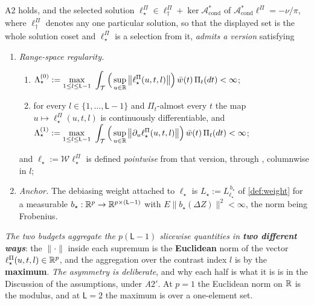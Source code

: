 \begin{assumption}\label{ass:sourcecondp}
A2 holds, and the selected solution
$\ell^\Pi_\star\in\ell^\Pi_\dagger+\ker\mathcal A^\ast_{\mathrm{cond}}$ of
$\mathcal A^\ast_{\mathrm{cond}}\ell^\Pi=-\nu/\pi$, where $\ell^\Pi_\dagger$ denotes any one
particular solution, so that the displayed set is the whole solution coset and $\ell^\Pi_\star$ is a
selection from it, \emph{admits a version} satisfying
\begin{enumerate}
\item[(i)] \emph{Range-space regularity.}
\begin{enumerate}
\item[(i.a)] $\Lambda^{(0)}_\star:=\displaystyle\max_{1\le l\le\mathsf L-1}\ \int_{\mathcal T}\Big(\sup_{u\in\mathbb{R}}\big\|\ell^\Pi_\star(u,t,l)\big\|\Big)\,\bar w(t)\,\Pi_t(dt)<\infty$;
\item[(i.b)] for every $l\in\{1,\dots,\mathsf L-1\}$ and $\Pi_t$-almost every $t$ the map
$u\mapsto\ell^\Pi_\star(u,t,l)$ is continuously
differentiable, and
$\Lambda^{(1)}_\star:=\displaystyle\max_{1\le l\le\mathsf L-1}\ \int_{\mathcal T}\Big(\sup_{u\in\mathbb{R}}\big\|\partial_u\ell^\Pi_\star(u,t,l)\big\|\Big)\,\bar w(t)\,\Pi_t(dt)<\infty$;
\end{enumerate}
and $\ell_\star:=\mathcal W\ell^\Pi_\star$ is defined \emph{pointwise} from that version, through
, columnwise in $l$;
\item[(iii)] \emph{Anchor.} The debiasing weight attached to $\ell_\star$ is
$L_\star:=L^{\,b_\star}_{\ell_\star}$ of \cref{def:weight} for a measurable
$b_\star:\mathbb{R}^{p}\to\mathbb{R}^{p\times(\mathsf L-1)}$ with $E\big\|b_\star(\Delta Z)\big\|^{2}<\infty$, the norm
being Frobenius.
\end{enumerate}
\emph{The two budgets aggregate the $p(\mathsf L-1)$ slicewise quantities in \textbf{two different
ways}}: the $\|\cdot\|$ inside each supremum is the \textbf{Euclidean} norm of the vector
$\ell^\Pi_\star(u,t,l)\in\mathbb{R}^{p}$, and the aggregation over the contrast index $l$ is by the
\textbf{maximum}. \emph{The asymmetry is deliberate}, and why each half is what it is is in the
Discussion of the assumptions, under \emph{A$2'$}. At $p=1$ the Euclidean norm on $\mathbb{R}$ is the modulus,
and at $\mathsf L=2$ the maximum is over a one-element set.
\end{assumption}

